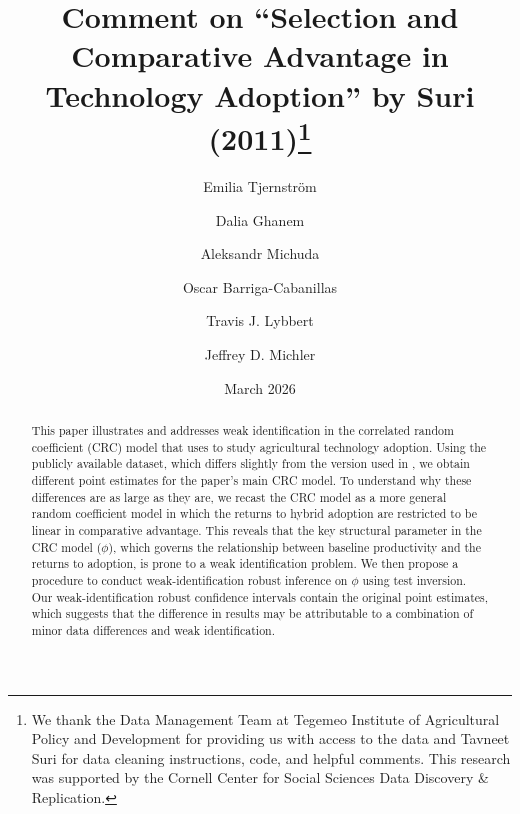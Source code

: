 \documentclass[12pt]{article}
\theoremstyle{plain}
\theoremstyle{definition}
\begin{document}
\begin{titlepage}
\title{Comment on ``Selection and Comparative Advantage in Technology Adoption'' by Suri (2011)\thanks{We thank the Data Management Team at Tegemeo Institute of Agricultural Policy and Development for providing us with access to the data and Tavneet Suri for data cleaning instructions, code, and helpful comments. This research was supported by the Cornell Center for Social Sciences Data Discovery \& Replication.}}
   

	\author[1,2]{Emilia Tjernstr\"{o}m}
	\author[3]{Dalia Ghanem}
  	\author[4]{Aleksandr Michuda}
	\author[5]{Oscar Barriga-Cabanillas}
	\author[3]{Travis J. Lybbert}

     \author[6]{Jeffrey D. Michler}



	\date{March 2026}

	\clearpage\maketitle
	\thispagestyle{empty}

\begin{center}
    \begin{abstract}
		\noindent
			This paper illustrates and addresses weak identification in the correlated random coefficient (CRC) model that \citet{S2011} uses to study agricultural technology adoption.
            Using the publicly available  dataset, which differs slightly from the version used in \citet{S2011}, we obtain different point estimates for the paper's main CRC model.
            To understand why these differences are as large as they are, we recast the CRC model as a more general random coefficient model in which the returns to hybrid adoption are restricted to be linear in comparative advantage.
			This reveals that the key structural parameter in the CRC model ($\phi$), which governs the relationship between baseline productivity and the returns to adoption, is prone to a weak identification problem.
			We then propose a procedure to conduct weak-identification robust inference on $\phi$ using test inversion.
            Our weak-identification robust confidence intervals contain the original \citet{S2011} point estimates, which suggests that the difference in results may be attributable to a combination of minor data differences and weak identification.
	\end{abstract}
\end{center}


\end{titlepage}
\end{document}
